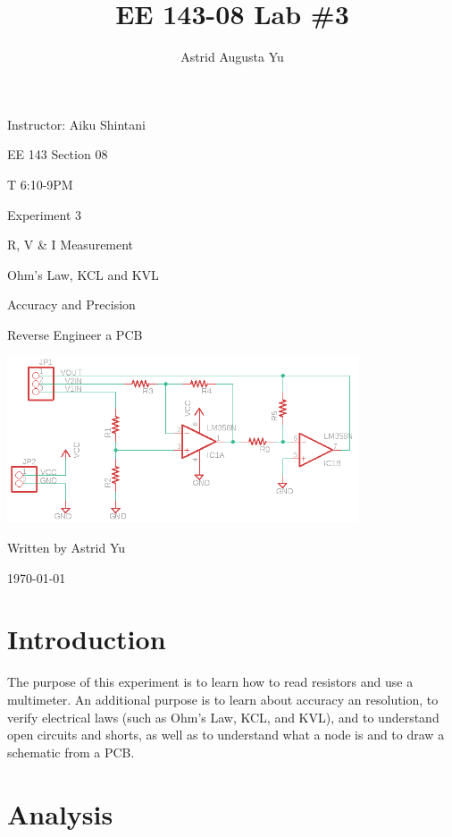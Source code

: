 \documentclass[12pt]{article}
\author{Astrid Augusta Yu}
\title{EE 143-08 Lab \#3}
\begin{document}
\begin{titlepage}
    \centering
    {
    \large
    Instructor: Aiku Shintani 
    \vspace{.25cm}
    
    EE 143 Section 08 \par \vspace{.2cm}\par
    T 6:10-9PM    
    }
    
    \vfill
    
    { \Huge Experiment 3 \par }
    { \Large
    R, V \& I Measurement \par Ohm's Law, KCL and KVL \par Accuracy and Precision \par Reverse Engineer a PCB \par
    }
    
    \vfill
    
    \includegraphics[width=0.78\textwidth]{revsch.png}\par\vspace{1cm}  
    \vfill
    
    {\large 
    Written by Astrid Yu\par
    \today}
\end{titlepage}

\section*{Introduction}

The purpose of this experiment is to learn how to read resistors and use a multimeter.
An additional purpose is to learn about accuracy an resolution, to verify electrical laws
(such as Ohm's Law, KCL, and KVL), and to understand open circuits and shorts, as well as 
to understand what a node is and to draw a schematic from a PCB.

\section*{Analysis}
\end{document}
